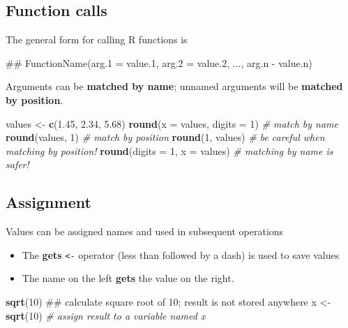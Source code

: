 \documentclass[]{book}
\newenvironment{Shaded}{\begin{snugshade}}{\end{snugshade}}
\newcommand{\KeywordTok}[1]{\textcolor[rgb]{0.13,0.29,0.53}{\textbf{#1}}}
\newcommand{\DataTypeTok}[1]{\textcolor[rgb]{0.13,0.29,0.53}{#1}}
\newcommand{\DecValTok}[1]{\textcolor[rgb]{0.00,0.00,0.81}{#1}}
\newcommand{\FloatTok}[1]{\textcolor[rgb]{0.00,0.00,0.81}{#1}}
\newcommand{\StringTok}[1]{\textcolor[rgb]{0.31,0.60,0.02}{#1}}
\newcommand{\CommentTok}[1]{\textcolor[rgb]{0.56,0.35,0.01}{\textit{#1}}}
\newcommand{\NormalTok}[1]{#1}
\providecommand{\tightlist}{%
  \setlength{\itemsep}{0pt}\setlength{\parskip}{0pt}}
\begin{document}
\subsection{Function calls}\label{function-calls}

The general form for calling R functions is

\begin{Shaded}
\begin{Highlighting}[]
\NormalTok{## FunctionName(arg.1 = value.1, arg.2 = value.2, ..., arg.n - value.n)}
\end{Highlighting}
\end{Shaded}

Arguments can be \textbf{matched by name}; unnamed arguments will be
\textbf{matched by position}.

\begin{Shaded}
\begin{Highlighting}[]
\NormalTok{values <-}\StringTok{ }\KeywordTok{c}\NormalTok{(}\FloatTok{1.45}\NormalTok{, }\FloatTok{2.34}\NormalTok{, }\FloatTok{5.68}\NormalTok{)}
\KeywordTok{round}\NormalTok{(}\DataTypeTok{x =}\NormalTok{ values, }\DataTypeTok{digits =} \DecValTok{1}\NormalTok{) }\CommentTok{# match by name}
\KeywordTok{round}\NormalTok{(values, }\DecValTok{1}\NormalTok{) }\CommentTok{# match by position}
\KeywordTok{round}\NormalTok{(}\DecValTok{1}\NormalTok{, values) }\CommentTok{# be careful when matching by position!}
\KeywordTok{round}\NormalTok{(}\DataTypeTok{digits =} \DecValTok{1}\NormalTok{, }\DataTypeTok{x =}\NormalTok{ values) }\CommentTok{# matching by name is safer!}
\end{Highlighting}
\end{Shaded}

\subsection{Assignment}\label{assignment}

Values can be assigned names and used in subsequent operations

\begin{itemize}
\tightlist
\item
  The \textbf{gets} \texttt{\textless{}-} operator (less than followed
  by a dash) is used to save values
\item
  The name on the left \textbf{gets} the value on the right.
\end{itemize}

\begin{Shaded}
\begin{Highlighting}[]
\KeywordTok{sqrt}\NormalTok{(}\DecValTok{10}\NormalTok{) ## calculate square root of 10; result is not stored anywhere}
\NormalTok{x <-}\StringTok{ }\KeywordTok{sqrt}\NormalTok{(}\DecValTok{10}\NormalTok{) }\CommentTok{# assign result to a variable named x}
\end{Highlighting}
\end{Shaded}
\end{document}
